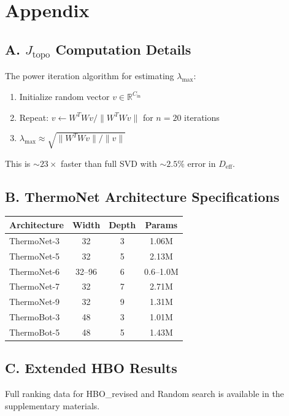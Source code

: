\documentclass[11pt, a4paper]{article}
\theoremstyle{plain}
\begin{document}
\appendix
\section*{Appendix}

\subsection*{A. $J_{\mathrm{topo}}$ Computation Details}

The power iteration algorithm for estimating $\lambda_{\max}$:
\begin{enumerate}
\item Initialize random vector $v \in \mathbb{R}^{C_{\mathrm{in}}}$
\item Repeat: $v \leftarrow W^T W v / \|W^T W v\|$ for $n=20$ iterations
\item $\lambda_{\max} \approx \sqrt{\|W^T W v\| / \|v\|}$
\end{enumerate}
This is $\sim 23\times$ faster than full SVD with $\sim 2.5\%$ error in $D_{\mathrm{eff}}$.

\subsection*{B. ThermoNet Architecture Specifications}

\begin{center}
\begin{tabular}{lccc}
\toprule
Architecture & Width & Depth & Params \\
\midrule
ThermoNet-3 & 32 & 3 & 1.06M \\
ThermoNet-5 & 32 & 5 & 2.13M \\
ThermoNet-6 & 32--96 & 6 & 0.6--1.0M \\
ThermoNet-7 & 32 & 7 & 2.71M \\
ThermoNet-9 & 32 & 9 & 1.31M \\
ThermoBot-3 & 48 & 3 & 1.01M \\
ThermoBot-5 & 48 & 5 & 1.43M \\
\bottomrule
\end{tabular}
\end{center}

\subsection*{C. Extended HBO Results}

Full ranking data for HBO\_revised and Random search is available in the supplementary materials.



\end{document}
